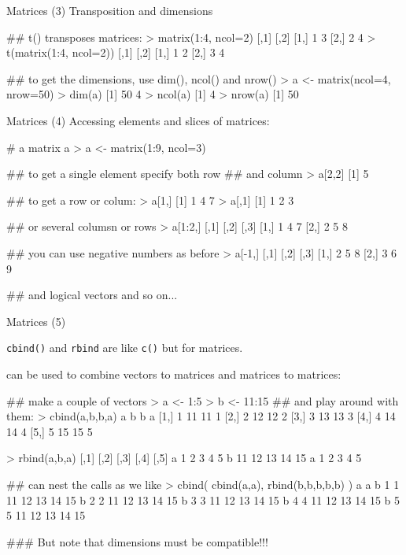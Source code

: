 \documentclass[pdf]{beamer}
\begin{document}
\begin{frame}[fragile]{Matrices (3)}
  Transposition and dimensions

  \begin{rcode}
    ## t() transposes matrices:
    > matrix(1:4, ncol=2)
          [,1] [,2]
    [1,]    1    3
    [2,]    2    4
    > t(matrix(1:4, ncol=2))
         [,1] [,2]
    [1,]    1    2
    [2,]    3    4

    ## to get the dimensions, use dim(), ncol() and nrow()
    > a <- matrix(ncol=4, nrow=50)
    > dim(a)
    [1] 50  4
    > ncol(a)
    [1] 4
    > nrow(a)
    [1] 50
  \end{rcode}
\end{frame}

\begin{frame}[fragile]{Matrices (4)}
  Accessing elements and slices of matrices:

  \begin{rcode}
    # a matrix a
    > a <- matrix(1:9, ncol=3)

    ## to get a single element specify both row
    ## and column
    > a[2,2]
    [1] 5
    
    ## to get a row or colum:
    > a[1,]
    [1] 1 4 7
    > a[,1]
    [1] 1 2 3

    ## or several columsn or rows
    > a[1:2,]
         [,1] [,2] [,3]
    [1,]    1    4    7
    [2,]    2    5    8

    ## you can use negative numbers as before
    > a[-1,]
         [,1] [,2] [,3]
    [1,]    2    5    8
    [2,]    3    6    9
    
    ## and logical vectors and so on...
  \end{rcode}
\end{frame}

\begin{frame}[fragile]{Matrices (5)}

  {\small
  \texttt{cbind()} and \texttt{rbind} are like \texttt{c()} but for matrices.
  
  can be used to combine vectors to matrices and matrices
  to matrices:
}
  \begin{rcode}
    ## make a couple of vectors
    > a <- 1:5
    > b <- 11:15
    ## and play around with them:
    > cbind(a,b,b,a)
         a  b  b a
    [1,] 1 11 11 1
    [2,] 2 12 12 2
    [3,] 3 13 13 3
    [4,] 4 14 14 4
    [5,] 5 15 15 5

    > rbind(a,b,a)
      [,1] [,2] [,3] [,4] [,5]
    a    1    2    3    4    5
    b   11   12   13   14   15
    a    1    2    3    4    5

    ## can nest the calls as we like
    > cbind( cbind(a,a), rbind(b,b,b,b,b) )
      a a               
    b 1 1 11 12 13 14 15
    b 2 2 11 12 13 14 15
    b 3 3 11 12 13 14 15
    b 4 4 11 12 13 14 15
    b 5 5 11 12 13 14 15
    
    ### But note that dimensions must be compatible!!!
  \end{rcode}
\end{frame}
\end{document}
